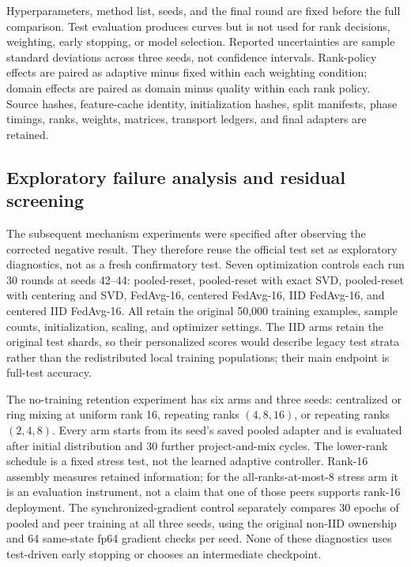 \documentclass[11pt]{article}
\begin{document}
Hyperparameters, method list, seeds, and the final round are fixed before the full comparison. Test evaluation produces curves but is not used for rank decisions, weighting, early stopping, or model selection. Reported uncertainties are sample standard deviations across three seeds, not confidence intervals. Rank-policy effects are paired as adaptive minus fixed within each weighting condition; domain effects are paired as domain minus quality within each rank policy. Source hashes, feature-cache identity, initialization hashes, split manifests, phase timings, ranks, weights, matrices, transport ledgers, and final adapters are retained.

\subsection{Exploratory failure analysis and residual screening}
The subsequent mechanism experiments were specified after observing the corrected negative result. They therefore reuse the official test set as exploratory diagnostics, not as a fresh confirmatory test. Seven optimization controls each run 30 rounds at seeds 42--44: pooled-reset, pooled-reset with exact SVD, pooled-reset with centering and SVD, FedAvg-16, centered FedAvg-16, IID FedAvg-16, and centered IID FedAvg-16. All retain the original 50,000 training examples, sample counts, initialization, scaling, and optimizer settings. The IID arms retain the original test shards, so their personalized scores would describe legacy test strata rather than the redistributed local training populations; their main endpoint is full-test accuracy.

The no-training retention experiment has six arms and three seeds: centralized or ring mixing at uniform rank 16, repeating ranks $(4,8,16)$, or repeating ranks $(2,4,8)$. Every arm starts from its seed's saved pooled adapter and is evaluated after initial distribution and 30 further project-and-mix cycles. The lower-rank schedule is a fixed stress test, not the learned adaptive controller. Rank-16 assembly measures retained information; for the all-ranks-at-most-8 stress arm it is an evaluation instrument, not a claim that one of those peers supports rank-16 deployment. The synchronized-gradient control separately compares 30 epochs of pooled and peer training at all three seeds, using the original non-IID ownership and 64 same-state fp64 gradient checks per seed. None of these diagnostics uses test-driven early stopping or chooses an intermediate checkpoint.
\end{document}
